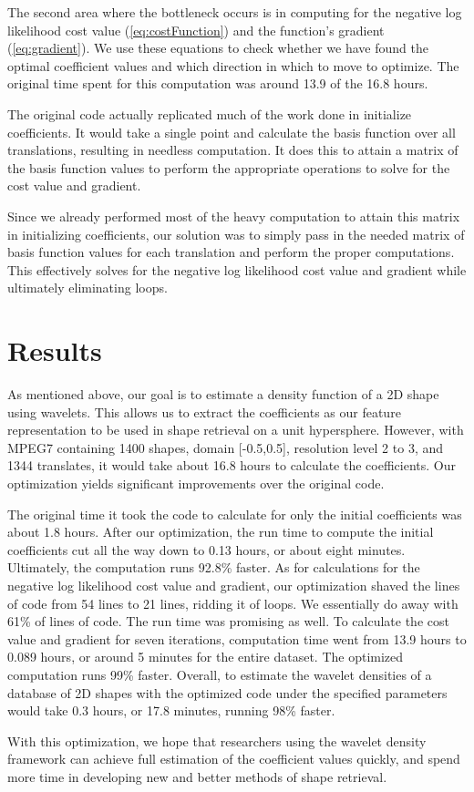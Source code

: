 \documentclass[../tech_report_1.tex]{subfiles}
\begin{document}
The second area where the bottleneck occurs is in computing for the
negative log likelihood cost value (\ref{eq:costFunction}) and the
function's gradient (\ref{eq:gradient}). We use these equations to
check whether we have found the  optimal coefficient values and
which direction in which to move to optimize. The original time spent for this
computation was around 13.9 of the 16.8 hours. 

The original code actually replicated much of the work done in initialize coefficients. It would take a single point and calculate the basis
function over all translations, resulting in needless computation.
It does this to attain a matrix of the basis function values to perform
the appropriate operations to solve for the cost value and gradient. 

Since we already performed most of the heavy computation to attain
this matrix in initializing coefficients, our solution was to simply
pass in the needed matrix of basis function values for each translation
and perform the proper computations. This effectively solves for the
negative log likelihood cost value and gradient while ultimately eliminating
loops. 

\section*{Results}

As mentioned above, our goal is to estimate a density function of
a 2D shape using wavelets. This allows us to extract the coefficients
as our feature representation to be used in shape retrieval on a unit
hypersphere. However, with MPEG7 containing 1400 shapes, domain {[}-0.5,0.5{]},
resolution level 2 to 3, and 1344 translates, it would take about 16.8
hours to calculate the coefficients. Our optimization yields significant improvements over the original code.

The original time it took the code to calculate for only the initial
coefficients was about 1.8 hours. After our optimization, the run
time to compute the initial coefficients cut all the way down to 0.13
hours, or about eight minutes. Ultimately, the computation runs 92.8\%
faster. As for calculations for the negative log likelihood cost value
and gradient, our optimization shaved the lines of code from 54 lines
to 21 lines, ridding it of loops. We essentially do away with 61\%
of lines of code. The run time was promising as well. To calculate
the cost value and gradient for seven iterations, computation time
went from 13.9 hours to 0.089 hours, or around 5 minutes for the entire
dataset. The optimized computation runs 99\% faster. Overall, to estimate
the wavelet densities of a database of 2D shapes with the optimized
code under the specified parameters would take 0.3 hours, or 17.8
minutes, running 98\% faster.

With this optimization, we hope that researchers using the wavelet density framework can achieve full estimation of the coefficient values quickly, and spend more
time in developing new and better methods of shape retrieval.
\end{document}
